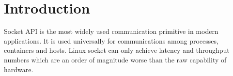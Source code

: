 \section{Introduction}
\label{sec:intro}


Socket API is the most widely used communication primitive in modern applications. It is used universally for communications among processes, containers and hosts.
Linux socket can only achieve latency and throughput numbers which are an order of magnitude worse than the raw capability of hardware.

